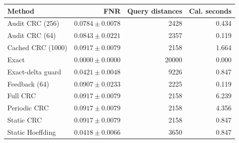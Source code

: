 \begin{tabular}{lrrr}
\hline
Method & FNR & Query distances & Cal. seconds \\
\hline
Audit CRC (256) & $0.0784 \pm 0.0078$ & 2428 & 0.434 \\
Audit CRC (64) & $0.0843 \pm 0.0221$ & 2357 & 0.119 \\
Cached CRC (1000) & $0.0917 \pm 0.0079$ & 2158 & 1.664 \\
Exact & $0.0000 \pm 0.0000$ & 20000 & 0.000 \\
Exact-delta guard & $0.0421 \pm 0.0048$ & 9226 & 0.847 \\
Feedback (64) & $0.0907 \pm 0.0233$ & 2225 & 0.119 \\
Full CRC & $0.0917 \pm 0.0079$ & 2158 & 6.239 \\
Periodic CRC & $0.0917 \pm 0.0079$ & 2158 & 4.356 \\
Static CRC & $0.0917 \pm 0.0079$ & 2158 & 0.847 \\
Static Hoeffding & $0.0418 \pm 0.0066$ & 3650 & 0.847 \\
\hline
\end{tabular}
